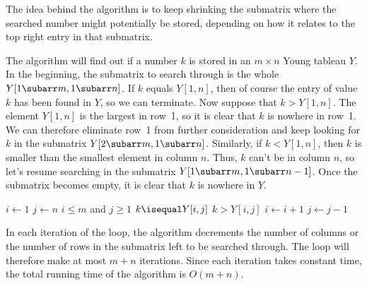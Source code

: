 The idea behind the  algorithm is to keep shrinking the submatrix where the searched number might potentially be stored, depending on how it relates to the top right entry in that submatrix.

The algorithm will find out if a number $k$ is stored in an $m\times n$ Young tableau $Y$.
In the beginning, the submatrix to search through is the whole $Y[1\subarr m,1\subarr n]$.
If $k$ equals $Y[1,n]$, then of course the entry of value $k$ has been found in $Y$, so we can terminate.
Now suppose that $k>Y[1,n]$.
The element $Y[1,n]$ is the largest in row~1, so it is clear that $k$ is nowhere in row~1.
We can therefore eliminate row~1 from further consideration and keep looking for $k$ in the submatrix $Y[2\subarr m,1\subarr n]$.
Similarly, if $k<Y[1,n]$, then $k$ is smaller than the smallest element in column $n$.
Thus, $k$ can't be in column $n$, so let's resume searching in the submatrix $Y[1\subarr m,1\subarr n-1]$.
Once the submatrix becomes empty, it is clear that $k$ is nowhere in $Y$.

\begin{codebox}
\li $i\gets1$
\li $j\gets n$
\li \While $i\le m$ and $j\ge1$
\li     \Do \If $k\isequal Y[i,j]$
\li             \Then \Return {}
                \End
\li         \If $k>Y[i,j]$
\li             \Then $i\gets i+1$
\li             \Else $j\gets j-1$
                \End
        \End
\li \Return {}
\end{codebox}

In each iteration of the  loop, the algorithm decrements the number of columns or the number of rows in the submatrix left to be searched through.
The  loop will therefore make at most $m+n$ iterations.
Since each iteration takes constant time, the total running time of the algorithm is $O(m+n)$.
